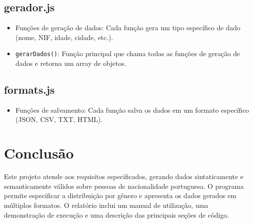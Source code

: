 \documentclass{article}
\begin{document}
\subsection{gerador.js}
\begin{itemize}
    \item Funções de geração de dados: Cada função gera um tipo específico de dado (nome, NIF, idade, cidade, etc.).
    \item \texttt{gerarDados()}: Função principal que chama todas as funções de geração de dados e retorna um array de objetos.
\end{itemize}

\subsection{formats.js}
\begin{itemize}
    \item Funções de salvamento: Cada função salva os dados em um formato específico (JSON, CSV, TXT, HTML).
\end{itemize}

\section{Conclusão}
Este projeto atende aos requisitos especificados, gerando dados sintaticamente e semanticamente válidos sobre pessoas de nacionalidade portuguesa. O programa permite especificar a distribuição por gênero e apresenta os dados gerados em múltiplos formatos. O relatório inclui um manual de utilização, uma demonstração de execução e uma descrição das principais seções de código.
\end{document}
